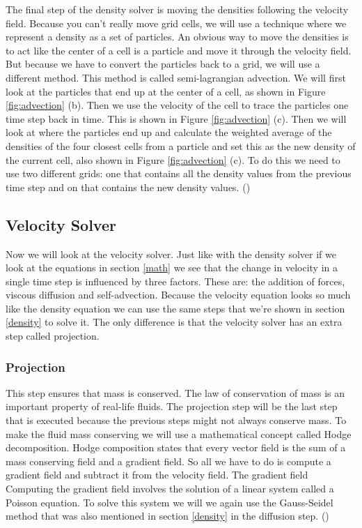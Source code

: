 \documentclass[a4paper,12pt]{article}
\begin{document}
The final step of the density solver is moving the densities following the velocity field.
Because you can't really move grid cells, we will use a technique where we represent a density as a set of particles.
An obvious way to move the densities is to act like the center of a cell is a particle and move it through the velocity field.
But because we have to convert the particles back to a grid, we will use a different method. 
This method is called semi-lagrangian advection.
We will first look at the particles that end up at the center of a cell, as shown in Figure \ref{fig:advection} (b). Then we use the velocity of the cell to trace the particles one time step back in time. This is shown in Figure \ref{fig:advection} (c).
Then we will look at where the particles end up and calculate the weighted average of the densities of the four closest cells from a particle and set this as the new density of the current cell, also shown in Figure \ref{fig:advection} (c).
To do this we need to use two different grids: one that contains all the density values from the previous time step
and on that contains the new density values. (\cite{josstam})
 
\subsection{Velocity Solver} \label{velocity}
Now we will look at the velocity solver. Just like with the density solver if we look at the equations in section \ref{math}
we see that the change in velocity in a single time step is influenced by three factors. 
These are: the addition of forces, viscous diffusion and self-advection. 
Because the velocity equation looks so much like the density equation we can use the same steps that we're shown in section \ref{density} to solve it.
The only difference is that the velocity solver has an extra step called projection.

\subsubsection{Projection}
This step ensures that mass is conserved. 
The law of conservation of mass is an important property of real-life fluids.
The projection step will be the last step that is executed because the previous steps might not always conserve mass.
To make the fluid mass conserving we will use a mathematical concept called Hodge decomposition.
Hodge composition states that every vector field is the sum of a mass conserving field and a gradient field.
So all we have to do is compute a gradient field and subtract it from the velocity field. 
The gradient field 
Computing the gradient field involves the solution of a linear system called a Poisson equation.
To solve this system we will we again use the Gauss-Seidel method that was also mentioned in section \ref{density} in the diffusion step. (\cite{josstam})
\end{document}
